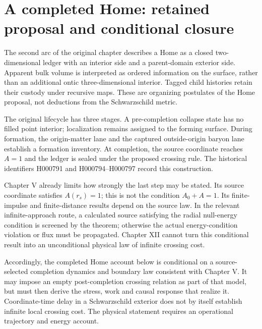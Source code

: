 \section{A completed Home: retained proposal and conditional closure}
The second arc of the original chapter describes a Home as a closed two-dimensional ledger with an interior side and a parent-domain exterior side. Apparent bulk volume is interpreted as ordered information on the surface, rather than an additional ontic three-dimensional interior. Tagged child histories retain their custody under recursive maps. These are organizing postulates of the Home proposal, not deductions from the Schwarzschild metric.

The original lifecycle has three stages. A pre-completion collapse state has no filled point interior; localization remains assigned to the forming surface. During formation, the origin-matter lane and the captured outside-origin baryon lane establish a formation inventory. At completion, the source coordinate reaches $A=1$ and the ledger is sealed under the proposed crossing rule. The historical identifiers H000791 and H000794--H000797 record this construction.

Chapter V already limits how strongly the last step may be stated. Its source coordinate satisfies $A(r_s)=1$; this is not the condition $A_0+A=1$. Its finite-impulse and finite-distance results depend on the source law. In the relevant infinite-approach route, a calculated source satisfying the radial null-energy condition is screened by the theorem; otherwise the actual energy-condition violation or flux must be propagated. Chapter XII cannot turn this conditional result into an unconditional physical law of infinite crossing cost.

Accordingly, the completed Home account below is conditional on a source-selected completion dynamics and boundary law consistent with Chapter V. It may impose an empty post-completion crossing relation as part of that model, but must then derive the stress, work and causal response that realize it. Coordinate-time delay in a Schwarzschild exterior does not by itself establish infinite local crossing cost. The physical statement requires an operational trajectory and energy account.

